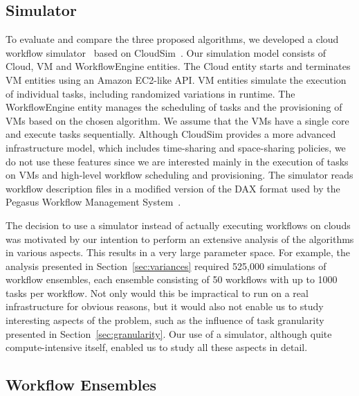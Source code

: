 \documentclass[preprint,5p]{elsarticle}
\begin{document}
\subsection{Simulator}

To evaluate and compare the three proposed algorithms, we developed a cloud
workflow simulator~\cite{CloudWorkflowSimulator} based on CloudSim~\cite{Calheiros2011}. Our
simulation model consists of Cloud, VM and WorkflowEngine entities. The Cloud entity starts and
terminates VM entities using an Amazon EC2-like API. VM entities simulate the
execution of individual tasks, including randomized variations in runtime. The
WorkflowEngine entity manages the scheduling of tasks and the provisioning of 
VMs based on the chosen algorithm. We assume that the VMs have a single core
and execute tasks sequentially. 
Although CloudSim provides a more advanced infrastructure model, which includes
time-sharing and space-sharing policies, we do not use these features since we
are interested mainly in the execution of tasks on VMs and high-level workflow
scheduling and provisioning. 
The simulator reads workflow description files in
a modified version of the DAX format used by the Pegasus Workflow Management
System~\cite{Deelman2005}. 

The decision to use a simulator instead of actually executing workflows on clouds 
was motivated by our intention to perform an extensive analysis of the algorithms
in various aspects. This results in a very large parameter space. For example, the analysis 
presented in Section~\ref{sec:variances} required 525,000 simulations 
of workflow ensembles, each ensemble consisting of 50 workflows with up to 1000 tasks per workflow.
Not only would this be impractical to run on a real infrastructure for obvious reasons, 
but it would also not enable us to study interesting aspects of the problem, such as the influence 
of task granularity presented in Section~\ref{sec:granularity}. 
Our use of a simulator, although quite compute-intensive itself, enabled us
to study all these aspects in detail.

\subsection{Workflow Ensembles}
\label{sec:ensembles}
\end{document}
